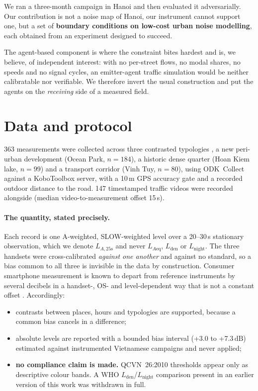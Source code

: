 \documentclass[10pt,twocolumn,a4paper]{article}
\newcommand{\LAt}{$L_{A,25\mathrm{s}}$}
\newcommand{\dB}{\ensuremath{\,\mathrm{dB}}}
\begin{document}
We ran a three-month campaign in Hanoi and then evaluated it adversarially. Our
contribution is not a noise map of Hanoi, our instrument cannot support one, but a set of \textbf{boundary conditions on low-cost urban noise modelling},
each obtained from an experiment designed to succeed.

The agent-based component is where the constraint bites hardest and is, we
believe, of independent interest: with no per-street flows, no modal shares, no
speeds and no signal cycles, an emitter-agent traffic simulation would be neither
calibratable nor verifiable. We therefore invert the usual construction and put
the agents on the \emph{receiving} side of a measured field.

\section{Data and protocol}

363 measurements were collected across three contrasted typologies
, a new peri-urban development (Ocean Park, $n=184$), a historic dense quarter
(Hoan Kiem lake, $n=99$) and a transport corridor (Vinh Tuy, $n=80$), using
ODK~Collect against a KoboToolbox server, with a 10\,m GPS accuracy gate and a
recorded outdoor distance to the road. 147 timestamped traffic videos were
recorded alongside (median video-to-measurement offset 15\,s).

\paragraph{The quantity, stated precisely.} Each record is one A-weighted,
SLOW-weighted level over a 20--30\,s stationary observation, which we denote
\LAt{} and never $L_{A\mathrm{eq}}$, $L_\mathrm{den}$ or $L_\mathrm{night}$. The three handsets
were cross-calibrated \emph{against one another} and against no standard, so a
bias common to all three is invisible in the data by construction. Consumer
smartphone measurement is known to depart from reference instruments by several
decibels in a handset-, OS- and level-dependent way that is not a constant offset
\citep{kardous2014smartphone, murphy2016smartphone}. Accordingly:

\begin{itemize}
  \item contrasts between places, hours and typologies are supported, because a
        common bias cancels in a difference;
  \item absolute levels are reported with a bounded bias interval
        (+3.0 to +7.3\dB) estimated against instrumented Vietnamese campaigns
        \citep{phan2010characteristics, gelb2019cyclists} and never applied;
  \item \textbf{no compliance claim is made.} QCVN~26:2010 \citep{qcvn26}
        thresholds appear only as descriptive colour bands. A WHO
        $L_\mathrm{den}$/$L_\mathrm{night}$ comparison present in an earlier
        version of this work was withdrawn in full.
\end{itemize}
\end{document}
